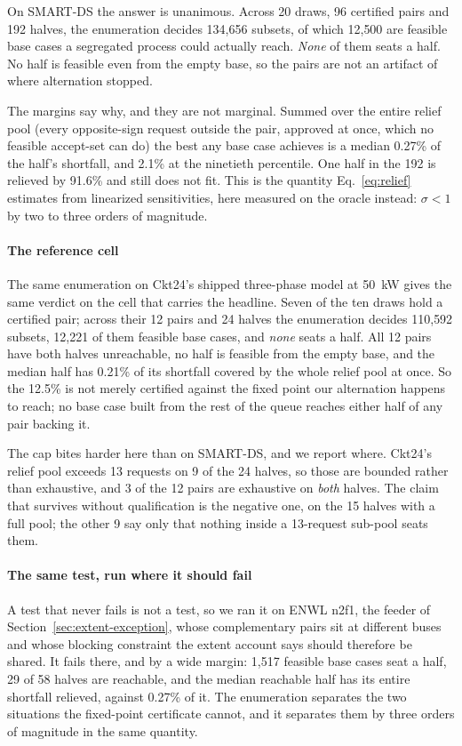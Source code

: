 \documentclass[review,authoryear,12pt]{elsarticle}
\begin{document}
On SMART-DS the answer is unanimous. Across 20 draws, 96 certified pairs and
192 halves, the enumeration decides 134{,}656 subsets, of which 12{,}500 are
feasible base cases a segregated process could actually reach. \emph{None} of
them seats a half. No half is feasible even from the empty base, so the pairs
are not an artifact of where alternation stopped.

The margins say why, and they are not marginal. Summed over the entire relief
pool (every opposite-sign request outside the pair, approved at once, which
no feasible accept-set can do) the best any base case achieves is a median
0.27\% of the half's shortfall, and 2.1\% at the ninetieth percentile. One
half in the 192 is relieved by 91.6\% and still does not fit. This is the
quantity Eq.~\eqref{eq:relief} estimates from linearized sensitivities, here
measured on the oracle instead: $\sigma < 1$ by two to three orders of
magnitude.

\paragraph{The reference cell}
The same enumeration on Ckt24's shipped three-phase model at 50~kW gives the
same verdict on the cell that carries the headline. Seven of the ten draws hold
a certified pair; across their 12 pairs and 24 halves the enumeration decides
110{,}592 subsets, 12{,}221 of them feasible base cases, and \emph{none} seats
a half. All 12 pairs have both halves unreachable, no half is feasible from the
empty base, and the median half has 0.21\% of its shortfall covered by the
whole relief pool at once. So the 12.5\% is not merely certified against the
fixed point our alternation happens to reach; no base case built from the rest
of the queue reaches either half of any pair backing it.

The cap bites harder here than on SMART-DS, and we report where. Ckt24's
relief pool exceeds 13 requests on 9 of the 24 halves, so those are bounded
rather than exhaustive, and 3 of the 12 pairs are exhaustive on \emph{both}
halves. The claim that survives without qualification is the negative one, on
the 15 halves with a full pool; the other 9 say only that nothing inside a
13-request sub-pool seats them.

\paragraph{The same test, run where it should fail}
A test that never fails is not a test, so we ran it on ENWL n2f1, the
feeder of Section~\ref{sec:extent-exception}, whose complementary pairs sit at
different buses and whose blocking constraint the extent account says should
therefore be shared. It fails there, and by a wide margin: 1{,}517 feasible
base cases seat a half, 29 of 58 halves are reachable, and the median reachable
half has its entire shortfall relieved, against 0.27\% of it. The
enumeration separates the two situations the fixed-point certificate cannot,
and it separates them by three orders of magnitude in the same quantity.
\end{document}
